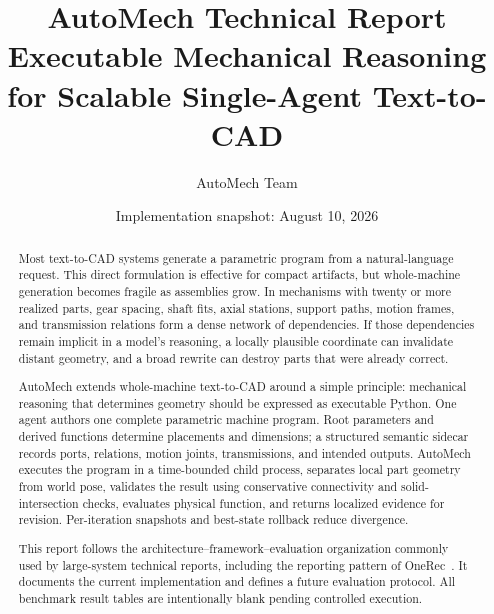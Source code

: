 \documentclass[10pt]{article}
\title{\textbf{AutoMech Technical Report}\\[0.4em]
\large Executable Mechanical Reasoning for Scalable Single-Agent Text-to-CAD}
\author{AutoMech Team}
\date{Implementation snapshot: August 10, 2026}
\begin{document}
\maketitle

\begin{center}
\end{center}

\begin{abstract}
Most text-to-CAD systems generate a parametric program from a natural-language request.
This direct formulation is effective for compact artifacts, but whole-machine generation
becomes fragile as assemblies grow. In mechanisms with twenty or more realized parts,
gear spacing, shaft fits, axial stations, support paths, motion frames, and transmission
relations form a dense network of dependencies. If those dependencies remain implicit in
a model's reasoning, a locally plausible coordinate can invalidate distant geometry, and
a broad rewrite can destroy parts that were already correct.

AutoMech extends whole-machine text-to-CAD around a simple principle: mechanical reasoning
that determines geometry should be expressed as executable Python. One agent authors one
complete parametric machine program. Root parameters and derived functions determine
placements and dimensions; a structured semantic sidecar records ports, relations, motion
joints, transmissions, and intended outputs. AutoMech executes the program in a
time-bounded child process, separates local part geometry from world pose, validates the
result using conservative connectivity and solid-intersection checks, evaluates physical
function, and returns localized evidence for revision. Per-iteration snapshots and
best-state rollback reduce divergence.

This report follows the architecture--framework--evaluation organization commonly used by
large-system technical reports, including the reporting pattern of OneRec~\cite{onerec}.
It documents the current implementation and defines a future evaluation protocol. All
benchmark result tables are intentionally blank pending controlled execution.
\end{abstract}
\end{document}
